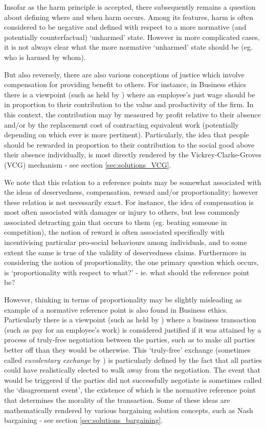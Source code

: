 Insofar as the harm principle is accepted, there subsequently remains a question about defining where and when harm occurs.
Among its features, harm is often considered to be negative and defined with respect to a more normative (and potentially counterfactual) `unharmed' state.
However in more complicated cases, it is not always clear what the more normative `unharmed' state should be (eg. who is harmed by whom).

But also reversely, there are also various conceptions of justice which involve compensation for providing benefit to others.
For instance, in Business ethics there is a viewpoint (such as held by \cite{sternberg2000just}) where an employee's just wage should be in proportion to their contribution to the value and productivity of the firm.
In this context, the contribution may by measured by profit relative to their absence and/or by the replacement cost of contracting equivalent work (potentially depending on which ever is more pertinent).
Particularly, the idea that people should be rewarded in proportion to their contribution to the social good above their absence individually, is most directly rendered by the Vickrey-Clarke-Groves (VCG) mechanism - see section \ref{sec:solutions_VCG}.

We note that this relation to a reference points may be somewhat associated with the ideas of deservedness, compensation, reward and/or proportionality; however these relation is not necessarily exact.
For instance, the idea of compensation is most often associated with damages or injury to others, but less commonly associated detracting gain that occurs to them (eg. beating someone in competition), the notion of reward is often associated specifically with incentivising particular pro-social behaviours among individuals, and to some extent the same is true of the validity of deservedness claims.
Furthermore in considering the notion of proportionality, the one primary question which occurs, is `proportionality with respect to what?' - ie. what should the reference point be?

However, thinking in terms of proportionality may be slightly misleading as example of a normative reference point is also found in Business ethics.
Particularly there is a viewpoint (such as held by \cite{ExecutiveCompensationUnjustorJustRight}) where a business transaction (such as pay for an employee's work) is considered justified if it was attained by a process of truly-free negotiation between the parties, such as to make all parties better off than they would be otherwise.
This `truly-free' exchange (sometimes called \textit{euvolentary exchange} by \cite{Guzman2019}) is particularly defined by the fact that all parties could have realistically elected to walk away from the negotiation.
The event that would be triggered if the parties did not successfully negotiate is sometimes called the `disagreement event', the existence of which is the normative reference point that determines the morality of the transaction.
Some of these ideas are mathematically rendered by various bargaining solution concepts, such as Nash bargaining - see section \ref{sec:solutions_bargaining}.

